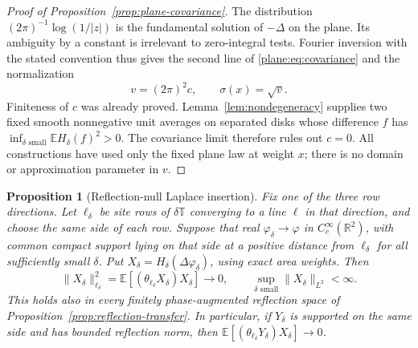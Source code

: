 \documentclass[11pt]{article}
\newtheorem{proposition}[theorem]{Proposition}
\theoremstyle{definition}
\theoremstyle{remark}
\numberwithin{equation}{section}
\begin{document}
\begin{proof}[Proof of Proposition~\ref{prop:plane-covariance}]
The distribution $(2\pi)^{-1}\log(1/|z|)$ is the fundamental
solution of $-\Delta$ on the plane.  Its ambiguity by a constant is
irrelevant to zero-integral tests.  Fourier inversion with the stated
convention thus gives the second line of \eqref{plane:eq:covariance}
and the normalization
\begin{equation}
 \label{plane:eq:normalization}
 v=(2\pi)^2c,\qquad \sigma(x)=\sqrt v.
\end{equation}
Finiteness of $c$ was already proved.  Lemma~\ref{lem:nondegeneracy}
supplies two fixed smooth nonnegative unit averages on separated
disks whose difference $f$ has
$\inf_{\delta\text{ small}}\mathbb E H_\delta(f)^2>0$.
The covariance limit therefore rules out $c=0$.
All constructions have used only the fixed plane law at weight $x$;
there is no domain or approximation parameter in $v$.
\end{proof}

\begin{proposition}[Reflection-null Laplace insertion]
\label{prop:reflection-null}
Fix one of the three row directions.  Let $\ell_\delta$ be site rows
of $\delta\mathbb T$ converging to a line $\ell$ in that direction, and
choose the same side of each row.  Suppose that real
$\varphi_\delta\to\varphi$ in $C_c^\infty(\mathbb R^2)$, with common
compact support lying on that side at a positive distance from
$\ell_\delta$ for all sufficiently small $\delta$.  Put
$X_\delta=H_\delta(\Delta\varphi_\delta)$, using exact area weights.
Then
\begin{equation}
 \label{plane:eq:reflection-null}
 \|X_\delta\|_{\ell_\delta}^2
   =\mathbb E[(\theta_{\ell_\delta}X_\delta)X_\delta]
       \longrightarrow0,
 \qquad \sup_{\delta\text{ small}}\|X_\delta\|_{L^2}<\infty.
\end{equation}
This holds also in every finitely phase-augmented reflection space of
Proposition~\ref{prop:reflection-transfer}.  In particular, if
$Y_\delta$ is supported on the same side and has bounded reflection
norm, then
$\mathbb E[(\theta_{\ell_\delta}Y_\delta)X_\delta]\to0$.
\end{proposition}
\end{document}
